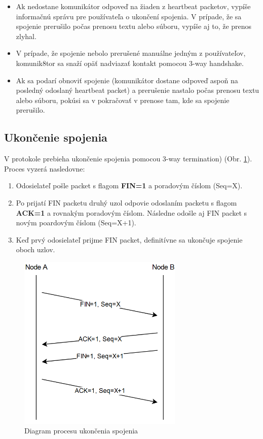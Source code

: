 \documentclass[a4paper,12pt]{article}
\begin{document}
	\begin{itemize}
	\item Ak nedostane komunikátor odpoveď na žiaden z heartbeat packetov, vypíše informačnú správu pre používateľa o ukončení spojenia. V prípade, že sa spojenie prerušilo počas prenosu textu alebo súboru, vypíše aj to, že prenos zlyhal.
	\item V prípade, že spojenie nebolo prerušené manuálne jedným z používateľov, komunik8tor sa snaží opäť nadviazať kontakt pomocou 3-way handshake.
	\item Ak sa podarí obnoviť spojenie (komunikátor dostane odpoveď aspoň na posledný odoslaný heartbeat packet) a prerušenie nastalo počas prenosu textu alebo súboru, pokúsi sa v pokračovať v prenose tam, kde sa spojenie prerušilo.
   	\end{itemize}

	\subsection{Ukončenie spojenia}
		V protokole prebieha ukončenie spojenia pomocou 3-way termination) (Obr. \ref{fig:disconnect_diagram}). Proces vyzerá nasledovne:
		\begin{enumerate}
			\item Odosielateľ pošle packet s flagom \textbf{FIN=1} a poradovým číslom (Seq=X).
			\item Po prijatí FIN packetu druhý uzol odpovie odoslaním packetu s flagom \textbf{ACK=1} a rovnakým poradovým číslom. Následne odošle aj FIN packet s novým poardovým číslom (Seq=X+1).
			\item Keď prvý odosielateľ prijme FIN packet, definitívne sa ukončuje spojenie oboch uzlov.

		\end{enumerate}
			
		\begin{figure}[h]
		    \centering
		    \includegraphics[width=0.70\textwidth]{disconnect_diagram.png}
		    \caption{Diagram procesu ukončenia spojenia}
		    \label{fig:disconnect_diagram}
		\end{figure}
\end{document}
